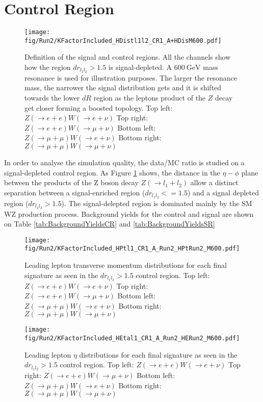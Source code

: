 \section{Control Region}

\begin{figure}[tph]
  \centering
  \texttt{[image: fig/Run2/KFactorIncluded\_HDistl1l2\_CR1\_A+HDisM600.pdf]}
  \caption{Definition of the signal and control regions. All the channels
    show how the region $dr_{l_{1}l_{2}} > 1.5$ is signal-depleted. A $600~\mathrm{GeV}$
    mass resonance is used for illustration purposes. The larger the resonance
    mass, the narrower the signal distribution gets and it is shifted towards
    the lower $dR$ region as the leptons product of the $Z$ decay get closer
    forming a boosted topology.
    Top left: $Z(\rightarrow e+e)W(\rightarrow e+\nu)$
    Top right: $Z(\rightarrow e+e)W(\rightarrow \mu+\nu)$
    Bottom left: $Z(\rightarrow \mu+\mu)W(\rightarrow e+\nu)$
    Bottom right: $Z(\rightarrow \mu+\mu)W(\rightarrow \mu+\nu)$}
  \label{fig:ControlRegionDefinition}
\end{figure}

In order to analyse the simulation quality, the data/MC ratio is studied on
a signal-depleted control region. As Figure \ref{fig:ControlRegionDefinition}
shows, the distance in the $\eta-\phi$ plane between the products
of the Z boson decay $Z(\rightarrow l_{1}+l_{2})$ allow a distinct separation between a signal-enriched
region ($dr_{l_{1}l_{2}} <= 1.5$) and a signal depleted region
($dr_{l_{1}l_{2}} > 1.5$). The signal-delepted region is dominated mainly by
the SM WZ production process. Background yields for the control and signal are
shown on Table \ref{tab:BackgroundYieldsCR} and \ref{tab:BackgroundYieldsSR}

\begin{figure}[tph]
  \centering
  \texttt{[image: fig/Run2/KFactorIncluded\_HPtl1\_CR1\_A\_Run2\_HPtRun2\_M600.pdf]}
  \caption{Leading lepton transverse momentum distributions for each final
    signature as seen in the $dr_{l_{1}l_{2}} > 1.5$ control region.
    Top left: $Z(\rightarrow e+e)W(\rightarrow e+\nu)$
    Top right: $Z(\rightarrow e+e)W(\rightarrow \mu+\nu)$
    Bottom left: $Z(\rightarrow \mu+\mu)W(\rightarrow e+\nu)$
    Bottom right: $Z(\rightarrow \mu+\mu)W(\rightarrow \mu+\nu)$}
  \label{fig:CR1_Run2_HPtl1}
\end{figure}

\begin{figure}[tph]
  \centering
  \texttt{[image: fig/Run2/KFactorIncluded\_HEtal1\_CR1\_A\_Run2\_HERun2\_M600.pdf]}
  \caption{Leading lepton $\eta$ distributions for each final
    signature as seen in the $dr_{l_{1}l_{2}} > 1.5$ control region.
    Top left: $Z(\rightarrow e+e)W(\rightarrow e+\nu)$
    Top right: $Z(\rightarrow e+e)W(\rightarrow \mu+\nu)$
    Bottom left: $Z(\rightarrow \mu+\mu)W(\rightarrow e+\nu)$
    Bottom right: $Z(\rightarrow \mu+\mu)W(\rightarrow \mu+\nu)$}
  \label{fig:CR1_Run2_HEtal1}
\end{figure}

